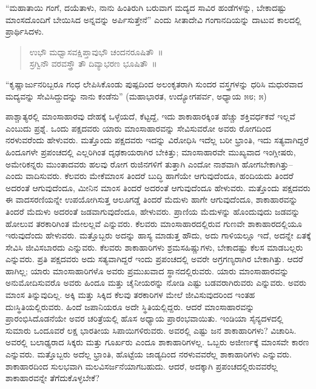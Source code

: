 \vspace{-0.3cm}


“ಮಹಾತಾಯಿ ಗಂಗೆ, ದಯೆತಾಳು, ನಾನು ಹಿಂತಿರುಗಿ ಬರುವಾಗ ಮದ್ಯದ ಸಾವಿರ ಹಂಡೆಗಳನ್ನು, ಬೇಕಾದಷ್ಟು ಮಾಂಸದೊಂದಿಗೆ ಬೇಯಿಸಿದ ಅನ್ನವನ್ನು ಅರ್ಪಿಸುತ್ತೇನೆ” ಎಂದು ಸೀತಾದೇವಿ ಗಂಗಾನದಿಯನ್ನು ದಾಟುವ ಕಾಲದಲ್ಲಿ ಪ್ರಾರ್ಥಿಸಿದಳು.
\begin{verse}
ಉಭೌ ಮಧ್ವಾಸವಕ್ಷಿಪ್ತಾವುಭೌ ಚಂದನರೂಷಿತೌ~॥\\ಸ್ರಗ್ವಿನೌ ವರವಸ್ತ್ರೌ ತೌ ದಿವ್ಯಾಭರಣ ಭೂಷಿತೌ~॥\\
\end{verse}


\vspace{-0.2cm}

“ಕೃಷ್ಣಾರ್ಜುನರಿಬ್ಬರೂ ಗಂಧ ಲೇಪಿಸಿಕೊಂಡು ಪುಷ್ಪದಿಂದ ಅಲಂಕೃತರಾಗಿ ಸುಂದರ ವಸ್ತ್ರಗಳನ್ನು ಧರಿಸಿ ಮಧುರವಾದ ಮದ್ಯವನ್ನು ಸೇವಿಸಿದ್ದುದನ್ನು ನಾನು ಕಂಡೆನು” (ಮಹಾಭಾರತ, ಉದ್ಯೋಗಪರ್ವ, ಅಧ್ಯಾಯ ೫೮; ೫)

ಪಾಶ್ಚಾತ್ಯರಲ್ಲಿ ಮಾಂಸಾಹಾರವು ದೇಹಕ್ಕೆ ಒಳ್ಳೆಯದೆ, ಕೆಟ್ಟದ್ದೆ, ಇದು ಶಾಕಾಹಾರಕ್ಕಿಂತ ಹೆಚ್ಚು ಶಕ್ತಿವರ್ಧಕವೆ ಇಲ್ಲವೆ ಎಂಬುದು ಪ್ರಶ್ನೆ. ಒಂದು ಪಕ್ಷದವರು ಯಾರು ಮಾಂಸಾಹಾರ\break ವನ್ನು ಸೇವಿಸುವರೋ ಅವರು ರೋಗದಿಂದ ನರಳುವರೆಂದು ಹೇಳುವರು. ಮತ್ತೊಂದು ಪಕ್ಷದವರು ಇದನ್ನು ವಿರೋಧಿಸಿ ಇದೆಲ್ಲ ಬರೀ ಭ್ರಾಂತಿ, ಇದು ಸತ್ಯವಾಗಿದ್ದರೆ ಹಿಂದೂಗಳೇ ಪ್ರಪಂಚದಲ್ಲಿ ಎಲ್ಲರಿಗಿಂತ ದೃಢಕಾಯರಾಗಿರ ಬೇಕಿತ್ತು; ಮಾಂಸಾಹಾರವೇ ಮುಖ್ಯವಾದ ಇಂಗ್ಲೀಷರು, ಅಮೇರಿಕನ್ನರು ಮುಂತಾದವರು ಹಲವು ರೋಗ ರುಜಿನಗಳಿಗೆ ತುತ್ತಾಗಿ ಎಂದೋ ನಾಶವಾಗಿ ಹೋಗಬೇಕಾಗಿತ್ತು– ಎಂದು ವಾದಿಸುವರು. ಕೆಲವರು ಮೇಕೆಮಾಂಸ ತಿಂದರೆ ಬುದ್ಧಿ ಹಾಗೆಯೇ ಆಗುವುದೆಂದೂ, ಹಂದಿಯದು ತಿಂದರೆ ಅದರಂತೆ ಆಗುವುದೆಂದೂ, ಮೀನಿನ ಮಾಂಸ ತಿಂದರೆ ಅದರಂತೆ ಆಗುವುದೆಂದೂ ಹೇಳುವರು. ಮತ್ತೊಂದು ಪಕ್ಷದವರು ಈ ವಾದಸರಣಿಯನ್ನೇ ಉಪಯೋಗಿಸುತ್ತ ಆಲೂಗಡ್ಡೆ ತಿಂದರೆ ಮೆದುಳು ಹಾಗೇ ಆಗುವುದೆಂದೂ, ಶಾಕಾಹಾರವನ್ನು ತಿಂದರೆ ಮೆದುಳು ಅದರಂತೆ ಜಡವಾಗುವುದೆಂದೂ, ಹೇಳುವರು. ಪ್ರಾಣಿಯ ಮೆದುಳನ್ನು ಹೊಂದುವುದು ಜಡವನ್ನು ಹೋಲುವ ತರಕಾರಿಗಿಂತ ಮೇಲಲ್ಲವೆ ಎನ್ನುವರು. ಕೆಲವರು ಮಾಂಸಾಹಾರದಲ್ಲಿರುವ ಗುಣವೇ ಶಾಕಾಹಾರದಲ್ಲಿಯೂ ಇರುವುದೆಂದು ಹೇಳುವರು. ಮತ್ತೊಬ್ಬರು ಅದನ್ನು ಹಾಸ್ಯ ಮಾಡುತ್ತ ಹೌದು, ಅದು ಗಾಳಿಯಲ್ಲೂ ಇದೆ, ಅದನ್ನೇ ಏತಕ್ಕೆ ಸೇವಿಸಿ ಜೀವಿಸಬಾರದು ಎನ್ನುವರು. ಕೆಲವರು ಶಾಕಾಹಾರಿಗಳು ಶ್ರಮಸಹಿಷ್ಣುಗಳು, ಬೇಕಾದಷ್ಟು ಕೆಲಸ ಮಾಡಬಲ್ಲರು ಎನ್ನುವರು. ಪ್ರತಿ ಪಕ್ಷದವರು ಅದು ಸತ್ಯವಾಗಿದ್ದರೆ ಇಂದು ಪ್ರಪಂಚದಲ್ಲಿ ಅವರೇ ಅಗ್ರಗಣ್ಯರಾಗಿರ ಬೇಕಾಗಿತ್ತು. ಆದರೆ ಹಾಗಿಲ್ಲ; ಯಾರು ಮಾಂಸಾಹಾರಿಗಳೊ ಅವರು ಪ್ರಮುಖವಾದ ಸ್ಥಾನದಲ್ಲಿರುವರು. ಯಾರು ಮಾಂಸಾಹಾರವನ್ನು ಅನುಮೋದಿಸುವರೊ ಅವರು ಹಿಂದೂ ಮತ್ತು ಚೈನೀಯರನ್ನು ನೋಡಿ ಎಷ್ಟು ಬಡವರಾಗಿರುವರು ಎನ್ನುವರು. ಅವರು ಮಾಂಸ ತಿನ್ನುವುದಿಲ್ಲ. ಅಕ್ಕಿ ಮತ್ತು ಸಿಕ್ಕಿದ ಕೆಲವು ತರಕಾರಿಗಳ ಮೇಲೆ ಜೀವಿಸುವುದರಿಂದ ಇಂತಹ ದುಃಸ್ಥಿತಿಯಲ್ಲಿರುವರು. ಹಿಂದೆ ಜಪಾನಿಯರೂ ಅದೇ ಸ್ಥಿತಿ\break ಯಲ್ಲಿದ್ದರು. ಆದರೆ ಮಾಂಸಾಹಾರವನ್ನು ಪ್ರಾರಂಭಿಸಿದೊಡನೆಯೇ ಅವರ ಚರಿತ್ರೆಯಲ್ಲಿ ಹೊಸ ಅಧ್ಯಾಯ ಪ್ರಾರಂಭವಾಯಿತು. ಇಂಡಿಯಾ ಸೈನ್ಯದಳದಲ್ಲಿ ಸುಮಾರು ಒಂದೂವರೆ ಲಕ್ಷ ಭಾರತೀಯ ಸಿಪಾಯಿಗಳಿರುವರು. ಅವರಲ್ಲಿ ಎಷ್ಟು ಜನ ಶಾಕಾಹಾರಿಗಳು? ವಿಚಾರಿಸಿ. ಅವರಲ್ಲಿ ಬಲಾಢ್ಯರಾದ ಸಿಕ್ಕರು ಮತ್ತು ಗೂರ್ಖರು ಎಂದೂ ಶಾಕಾಹಾರಿಗಳಲ್ಲ. ಒಬ್ಬರು ಅಜೀರ್ಣಕ್ಕೆ ಮಾಂಸವೇ ಕಾರಣ ಎನ್ನುವರು. ಮತ್ತೊಬ್ಬರು ಅದೆಲ್ಲ ಭ್ರಾಂತಿ, ಹೊಟ್ಟೆಯ ಜಾಡ್ಯದಿಂದ ನರಳುವವರೆಲ್ಲ ಶಾಕಾಹಾರಿಗಳು ಎನ್ನುವರು. ಶಾಕಾಹಾರದಿಂದ ಸುಲಭವಾಗಿ ಮಲವಿಸರ್ಜನೆಯಾಗಬಹುದು. ಆದರೆ, ಅದಕ್ಕಾಗಿ ಪ್ರಪಂಚದಲ್ಲಿರುವವರೆಲ್ಲ ಶಾಕಾಹಾರ\break ವನ್ನೇ ತೆಗೆದುಕೊಳ್ಳಬೇಕೆ?

